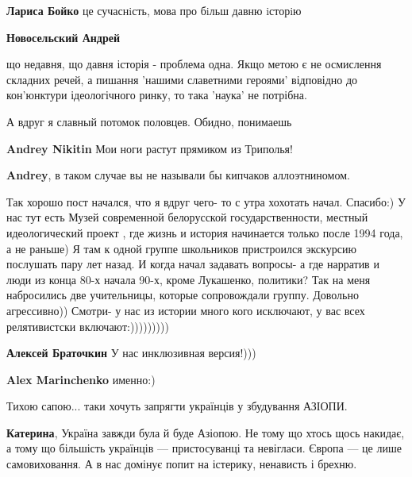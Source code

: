 \begin{itemize}
\begin{itemize}
\textbf{Лариса Бойко} це сучаснiсть, мова про бiльш давню iсторiю

\textbf{Новосельский Андрей} 

що недавня, що давня історія - проблема одна. Якщо метою є не осмислення
складних речей, а пишання 'нашими славетними героями' відповідно до кон'юнктури
ідеологічного ринку, то така 'наука' не потрібна.

\end{itemize} %

А вдруг я славный потомок половцев. Обидно, понимаешь

\begin{itemize} %
\textbf{Andrey Nikitin} Мои ноги растут прямиком из Триполья!

\textbf{Andrey}, в таком случае вы не называли бы кипчаков аллоэтниномом.
\end{itemize} %


Так хорошо пост начался, что я вдруг чего- то с утра хохотать начал. Спасибо:)
У нас тут есть Музей современной белорусской государственности, местный
идеологический проект , где жизнь и история начинается только после 1994 года,
а не раньше) Я там к одной группе школьников пристроился экскурсию послушать
пару лет назад. И когда начал задавать вопросы- а где нарратив и люди из конца
80-х начала 90-х, кроме Лукашенко, политики? Так на меня набросились две
учительницы, которые сопровождали группу. Довольно агрессивно)) Смотри- у нас
из истории много кого исключают, у вас всех релятивистски включают:)))))))))

\begin{itemize} %
\textbf{Алексей Браточкин} У нас инклюзивная версия!)))

\textbf{Alex Marinchenko} именно:)
\end{itemize} %

Тихою сапою... таки хочуть запрягти українців у збудування АЗІОПИ.

\begin{itemize} %
\textbf{Катерина}, Україна завжди була й буде Азіопою. Не тому що хтось щось накидає, а тому що більшість українців — пристосуванці та невігласи. Європа — це лише самовиховання. А в нас домінує попит на істерику, ненависть і брехню.
\end{itemize} %


\end{itemize}

